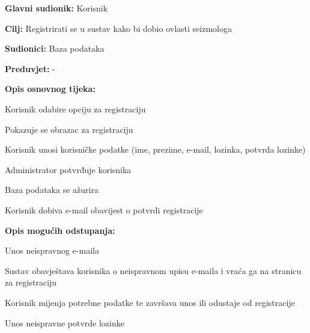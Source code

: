 					\noindent {}
					\begin{packed_item}
	
						\item \textbf{Glavni sudionik:} Korisnik
						\item \textbf{Cilj:} Registrirati se u sustav kako bi dobio ovlasti seizmologa
						\item \textbf{Sudionici:} Baza podataka
						\item \textbf{Preduvjet:} -
						\item \textbf{Opis osnovnog tijeka:}
						
						\item[] \begin{packed_enum}
	
							\item Korisnik odabire opciju za registraciju
							\item Pokazuje se obrazac za registraciju
							\item Korisnik unosi korisničke podatke (ime, prezime, e-mail, lozinka, potvrda lozinke)
							\item Administrator potvrđuje korisnika
							\item Baza podataka se ažurira
							\item Korisnik dobiva e-mail obavijest o potvrdi registracije
						
						\end{packed_enum}
						
						\item  \textbf{Opis mogućih odstupanja:}
						
						\item[] \begin{packed_item}
	
							\item[3.a] Unos neispravnog e-maila
							\item[] \begin{packed_enum}
								
								\item Sustav obavještava korisnika o neispravnom upisu e-maila i vraća ga na stranicu za registraciju
								\item Korisnik mijenja potrebne podatke te završava unos ili odustaje od registracije
								
							\end{packed_enum}
							\item[3.b] Unos neispravne potvrde lozinke
							\item[] \begin{packed_enum}
								

\end{packed_enum}
\end{packed_item}
\end{packed_item}
